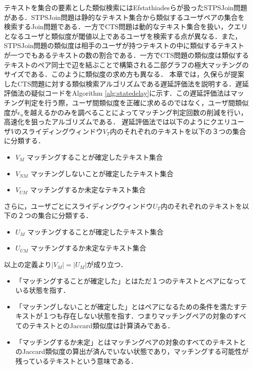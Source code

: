 テキストを集合の要素とした類似検索にはEfstathiadesらが扱ったSTPSJoin問題\cite{efstathiades}がある．STPSJoin問題は静的なテキスト集合から類似するユーザペアの集合を検索するJoin問題である．一方でCTS問題は動的なテキスト集合を扱い，クエリとなるユーザと類似度が閾値以上であるユーザを検索する点が異なる．また，STPSJoin問題の類似度は相手のユーザが持つテキストの中に類似するテキストが一つでもあるテキストの数の割合である．一方でCTS問題の類似度は類似するテキストのペア同士で辺を結ぶことで構築される二部グラフの極大マッチングのサイズである．このように類似度の求め方も異なる．
本章では，久保らが提案したCTS問題に対する類似検索アルゴリズムである遅延評価法を説明する．遅延評価法の疑似コードをAlgorithm \ref{alg:statedelay}に示す．この遅延評価法はマッチング判定を行う際，ユーザ間類似度を正確に求めるのではなく，ユーザ間類似度が$\epsilon_u$を越えるかのみを調べることによってマッチング判定回数の削減を行い，高速化を狙ったアルゴリズムである．
遅延評価法では以下のようにクエリユーザ$V$のスライディングウィンドウ$V_{T}$内のそれぞれのテキストを以下の３つの集合に分類する．
\begin{itemize}
  \item $V_{M}$ マッチングすることが確定したテキスト集合
  \item $V_{NM}$ マッチングしないことが確定したテキスト集合
  \item $V_{UM}$ マッチングするか未定なテキスト集合
\end{itemize}
さらに，ユーザごとにスライディングウィンドウ$U_{T}$内のそれぞれのテキストを以下の２つの集合に分類する．
\begin{itemize}
  \item $U_{M}$ マッチングすることが確定したテキスト集合
  \item $U_{UM}$ マッチングするか未定なテキスト集合
\end{itemize}

以上の定義より$|V_M|=|U_M|$が成り立つ．
\begin{itemize}
    \item 「マッチングすることが確定した」とはただ１つのテキストとペアになっている状態を指す．
    \item 「マッチングしないことが確定した」とはペアになるための条件を満たすテキストが１つも存在しない状態を指す．つまりマッチングペアの対象のすべてのテキストとのJaccard類似度は計算済みである．
    \item 「マッチングするか未定」とはマッチングペアの対象のすべてのテキストとのJaccard類似度の算出が済んでいない状態であり，マッチングする可能性が残っているテキストという意味である．
\end{itemize}

